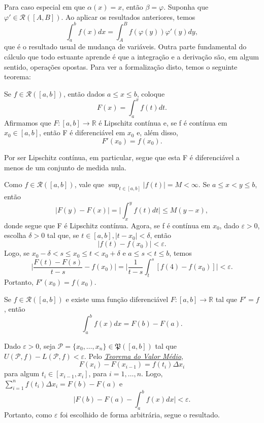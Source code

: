 \documentclass[../analysis_notes.tex]{subfiles}
\begin{document}
Para caso especial em que \(\alpha (x)=x\), então \(\beta = \varphi \). Suponha que \(\varphi'\in \mathcal{R}([A, B])\). Ao aplicar os resultados anteriores, temos
\[
	\int_{a}^{b}f(x)dx = \int_{A}^{B}f(\varphi (y))\varphi '(y)dy,
\]
que é o resultado usual de mudança de variáveis. Outra parte fundamental do cálculo que todo estuante aprende é que a integração e a derivação são, em algum sentido, operações opostas. Para ver a formalização disto, temos o seguinte teorema:
\begin{theorem*}
	Se \(f\in \mathcal{R}([a, b])\), então dados \(a\leq x\leq b\), coloque
	\[
		F(x)=\int_{a}^{x}f(t)dt.
	\]
	Afirmamos que \(F:[a, b]\rightarrow \mathbb{R}\) é Lipschitz contínua e, se f é contínua em \(x_{0}\in [a, b]\), então F é diferenciável em \(x_{0}\) e, além disso,
	\[
		F'(x_{0})=f(x_{0}).
	\]
\end{theorem*}
Por ser Lipschitz contínua, em particular, segue que esta F é diferenciável a menos de um conjunto de medida nula.
\begin{proof*}
	Como \(f\in \mathcal{R}([a, b])\), vale que \(\sup_{t\in[a,b]}|f(t)|=M<\infty\). Se \(a\leq x<y\leq b\), então
	\[
		|F(y)-F(x)|=\biggl\vert \int_{x}^{y}f(t)dt \biggr\vert\leq M(y-x),
	\]
	donde segue que F é Lipschitz contínua. Agora, se f é contínua em \(x_{0}\), dado \(\varepsilon > 0\), escolha \(\delta >0\) tal que, se \(t\in[a, b], |t-x_{0}|<\delta \), então
	\[
		|f(t)-f(x_{0})|<\varepsilon .
	\]
	Logo, se \(x_{0}-\delta <s\leq x_{0}\leq t<x_{0}+\delta \) e \(a\leq s<t\leq b\), temos
	\[
		\biggl\vert \frac{F(t)-F(s)}{t-s}-f(x_{0}) \biggr\vert = \biggl\vert \frac{1}{t-s}\int_{t}^{s}[f(4)-f(x_{0})] \biggr\vert <\varepsilon .
	\]
	Portanto, \(F'(x_{0})=f(x_{0})\). \qedsymbol
\end{proof*}
\hypertarget{fundamental_theorem_of_calculus}{
	\begin{theorem*}
		Se \(f\in \mathcal{R}([a, b])\) e existe uma função diferenciável \(F:[a, b]\rightarrow \mathbb{R}\) tal que \(F'=f\), então
		\[
			\int_{a}^{b}f(x)dx=F(b)-F(a).
		\]
	\end{theorem*}
}
\begin{proof*}
	Dado \(\varepsilon >0\), seja \(\mathcal{P}=\{x_{0}, \dotsc , x_{n}\}\in \mathfrak{P}([a, b])\) tal que \(U(\mathcal{P}, f)-L(\mathcal{P}, f)<\varepsilon .\) Pelo \hyperlink{mean_value}{\textit{Teorema do Valor Médio}},
	\[
		F(x_{i})-F(x_{i-1})=f(t_{i})\Delta x_{i}
	\]
	para algum \(t_{i}\in[x_{i-1}, x_{i}]\), para \(i=1,\dotsc ,n\). Logo, \(\sum\limits_{i=1}^{n}f(t_{i})\Delta x_{i}=F(b)-F(a)\) e
	\[
		\biggl\vert F(b)-F(a)-\int_{a}^{b}f(x)dx \biggr\vert<\varepsilon .
	\]
	Portanto, como \(\varepsilon \) foi escolhido de forma arbitrária, segue o resultado. \qedsymbol
\end{proof*}
\end{document}
